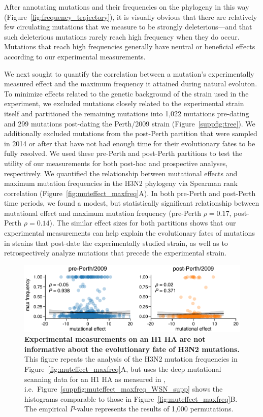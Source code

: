 \documentclass[9pt,twocolumn,twoside]{pnas-new-for-biorxiv}
\begin{document}
After annotating mutations and their frequencies on the phylogeny in this way (Figure~\ref{fig:frequency_trajectory}), it is visually obvious that there are relatively few circulating mutations that we measure to be strongly deleterious---and that such deleterious mutations rarely reach high frequency when they do occur.
Mutations that reach high frequencies generally have neutral or beneficial effects according to our experimental measurements.

We next sought to quantify the correlation between a mutation's experimentally measured effect and the maximum frequency it attained during natural evoluton.
To minimize effects related to the genetic background of the strain used in the experiment, we excluded mutations closely related to the experimental strain itself and partitioned the remaining mutations into 1,022 mutations pre-dating and 299 mutations post-dating the Perth/2009 strain (Figure~\ref{suppfig:tree}).
We additionally excluded mutations from the post-Perth partition that were sampled in 2014 or after that have not had enough time for their evolutionary fates to be fully resolved.
We used these pre-Perth and post-Perth partitions to test the utility of our measurements for both post-hoc and prospective analyses, respectively.
We quantified the relationship between mutational effects and maximum mutation frequencies in the H3N2 phylogeny via Spearman rank correlation (Figure~\ref{fig:muteffect_maxfreq}A).
In both pre-Perth and post-Perth time periods, we found a modest, but statistically significant relationship between mutational effect and maximum mutation frequency (pre-Perth $\rho = 0.17$, post-Perth $\rho = 0.14$).
The similar effect sizes for both partitions shows that our experimental measurements can help explain the evolutionary fates of mutations in strains that post-date the experimentally studied strain, as well as to retrospectively analyze mutations that precede the experimental strain. 

\begin{figure}
\centering
\includegraphics[width=12cm]{figs/muteffect_by_maxfreq_WSN/muteffect_by_maxfreq_WSN.pdf}
\caption{\label{fig:muteffect_maxfreq_WSN}
{\bf Experimental measurements on an H1 HA are not informative about the evolutionary fate of H3N2 mutations.}
This figure repeats the analysis of the H3N2 mutation frequencies in Figure~\ref{fig:muteffect_maxfreq}A, but uses the deep mutational scanning data for an H1 HA as measured in \cite{doud2016accurate}, i.e.\
Figure~\ref{suppfig:muteffect_maxfreq_WSN_supp} shows the histograms comparable to those in Figure~\ref{fig:muteffect_maxfreq}B.
The empirical $P$-value represents the results of 1,000 permutations.
}
\end{figure}
\end{document}
